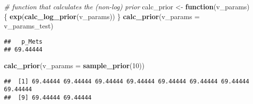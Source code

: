 \documentclass[
]{article}
\newenvironment{Shaded}{\begin{snugshade}}{\end{snugshade}}
\newcommand{\CommentTok}[1]{\textcolor[rgb]{0.56,0.35,0.01}{\textit{#1}}}
\newcommand{\ControlFlowTok}[1]{\textcolor[rgb]{0.13,0.29,0.53}{\textbf{#1}}}
\newcommand{\DataTypeTok}[1]{\textcolor[rgb]{0.13,0.29,0.53}{#1}}
\newcommand{\DecValTok}[1]{\textcolor[rgb]{0.00,0.00,0.81}{#1}}
\newcommand{\KeywordTok}[1]{\textcolor[rgb]{0.13,0.29,0.53}{\textbf{#1}}}
\newcommand{\NormalTok}[1]{#1}
\newcommand{\StringTok}[1]{\textcolor[rgb]{0.31,0.60,0.02}{#1}}
\begin{document}
\begin{Shaded}
\begin{Highlighting}[]
\CommentTok{# function that calculates the (non-log) prior}
\NormalTok{calc_prior <-}\StringTok{ }\ControlFlowTok{function}\NormalTok{(v_params) \{ }
  \KeywordTok{exp}\NormalTok{(}\KeywordTok{calc_log_prior}\NormalTok{(v_params)) }
\NormalTok{\}}
\KeywordTok{calc_prior}\NormalTok{(}\DataTypeTok{v_params =}\NormalTok{ v_params_test)}
\end{Highlighting}
\end{Shaded}

\begin{verbatim}
##   p_Mets 
## 69.44444
\end{verbatim}

\begin{Shaded}
\begin{Highlighting}[]
\KeywordTok{calc_prior}\NormalTok{(}\DataTypeTok{v_params =} \KeywordTok{sample_prior}\NormalTok{(}\DecValTok{10}\NormalTok{))}
\end{Highlighting}
\end{Shaded}

\begin{verbatim}
##  [1] 69.44444 69.44444 69.44444 69.44444 69.44444 69.44444 69.44444 69.44444
##  [9] 69.44444 69.44444
\end{verbatim}
\end{document}
